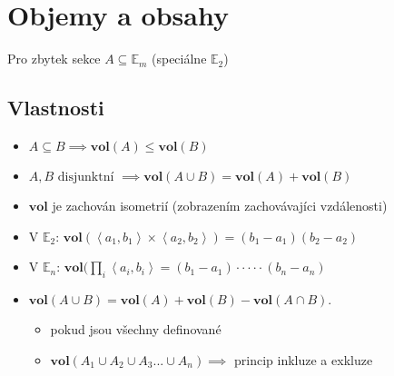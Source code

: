 \documentclass[../main.tex]{subfiles}
\begin{document}
\section{Objemy a obsahy}
Pro zbytek sekce $A \subseteq \mathbb{E}_m$ (speciálne $\mathbb{E}_2$)

\subsection{Vlastnosti}
\begin{itemize}
    \item $A \subseteq B \implies \mathbf{vol}(A) \leq \mathbf{vol}(B)$
    \item $A, B \text{ disjunktní } \implies \mathbf{vol}(A \cup B) = \mathbf{vol}(A) + \mathbf{vol}(B)$
		\item $\mathbf{vol}$ je zachován isometrií (zobrazením zachovávajíci vzdálenosti)
    \item V $\mathbb{E}_2$: $\mathbf{vol}(\left<a_1,b_1\right>\times \left<a_2,b_2\right>) = (b_1 - a_1)(b_2 - a_2)$
    \item V $\mathbb{E}_n$: $\mathbf{vol}(\prod_i \left<a_i,b_i\right> = (b_1 - a_1) \cdot \cdot \cdot \cdot \cdot (b_n-a_n)$
		\item $\mathbf{vol}(A \cup B) = \mathbf{vol}(A)+\mathbf{vol}(B)-\mathbf{vol}(A \cap B).$
		\begin{itemize}
			\item pokud jsou všechny definované
			\item $\textbf{vol}(A_1\cup A_2\cup A_3...\cup A_n) \implies$ princip inkluze a exkluze
		\end{itemize}
\end{itemize}
\end{document}
